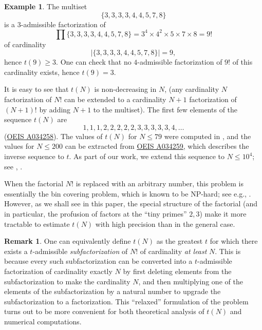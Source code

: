 \documentclass[12pt,a4paper,reqno]{amsart}
\numberwithin{equation}{section}
\theoremstyle{plain}
\theoremstyle{definition}
\newtheorem{remark}[theorem]{Remark}
\newtheorem{example}[theorem]{Example}
\begin{document}
\begin{example}\label{nine}  The multiset
  $$ \{ 3,3,3,3,4,4,5,7,8\}$$
  is a $3$-admissible factorization of 
$$ \prod \{ 3,3,3,3,4,4,5,7,8\} = 3^4 \times 4^2 \times 5 \times 7 \times 8 = 9!$$
of cardinality 
$$|\{ 3,3,3,3,4,4,5,7,8\}| = 9,$$
 hence $t(9) \geq 3$.  One can check that no $4$-admissible factorization of $9!$ of this cardinality exists, hence $t(9) = 3$.
\end{example}

It is easy to see that $t(N)$ is non-decreasing in $N$, (any cardinality $N$ factorization of $N!$ can be extended to a cardinality $N+1$ factorization of $(N+1)!$ by adding $N+1$ to the multiset).  The first few elements of the sequence $t(N)$ are
$$ 1,1,1,2,2,2,2,2,3,3,3,3,3,4, \dots$$
(\href{https://oeis.org/A034258}{OEIS A034258}). The values of $t(N)$ for $N \leq 79$ were computed in \cite{guy}, and the values for $N \leq 200$ can be extracted from \href{https://oeis.org/A034259}{OEIS A034259}, which describes the inverse sequence to $t$.  As part of our work, we extend this sequence to $N \leq 10^4$; see \cite{github}, .

When the factorial $N!$ is replaced with an arbitrary number, this problem is essentially the bin covering problem, which is known to be NP-hard; see e.g., \cite{bincover}.  However, as we shall see in this paper, the special structure of the factorial (and in particular, the profusion of factors at the ``tiny primes'' $2,3$) make it more tractable to estimate $t(N)$ with high precision than in the general case.

\begin{remark}\label{subfac}  One can equivalently define $t(N)$ as the greatest $t$ for which there exists a $t$-admissible \emph{subfactorization} of $N!$ of cardinality \emph{at least} $N$.  This is because every such subfactorization can be converted into a $t$-admissible factorization of cardinality exactly $N$ by first deleting elements from the subfactorization to make the cardinality $N$, and then multiplying one of the elements of the subfactorization by a natural number to upgrade the subfactorization to a factorization.  This ``relaxed'' formulation of the problem turns out to be more convenient for both theoretical analysis of $t(N)$ and numerical computations.
\end{remark}
\end{document}
